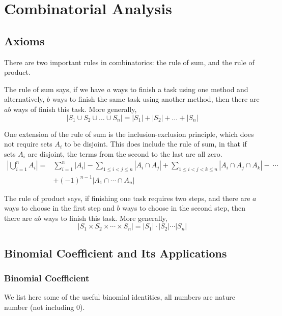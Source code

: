 \chapter{Combinatorial Analysis}
\section{Axioms} 
There are two important rules in combinatorics: the rule of sum, and the rule of product.

The rule of sum says, if we have $a$ ways to finish a task using one method and alternatively, $b$ ways to finish the same task using another method, then there are $ab$ ways of finish this task. More generally,
\begin{equation}
	|S_1 \cup S_2 \cup \ldots \cup S_n| = |S_1| + |S_2| + \ldots + |S_n|
\end{equation}

One extension of the rule of sum is the inclusion-exclusion principle, which does not require sets $A_i$ to be disjoint. This does include the rule of sum, in that if sets $A_i$ are disjoint, the terms from the second to the last are all zero.
\begin{equation}
\begin{split}
|\bigcup_{i=1}^n A_i| = & \sum_{i=1}^n|A_i| - \sum_{1 \le i < j \le n}|A_i\cap A_j| + \sum_{1 \le i < j < k \le n}|A_i\cap A_j\cap A_k|-\ \cdots\ \\
&  +  \left(-1\right)^{n-1} |A_1\cap\cdots\cap A_n|
\end{split}
\end{equation}

The rule of product says, if finishing one task requires two steps, and there are $a$ ways to choose in the first step and $b$ ways to choose in the second step, then there are $ab$ ways to finish this task. More generally,
\begin{equation}
|S_1 \times S_2 \times \cdots \times S_n| = |S_{1}| \cdot |S_{2}| \cdots |S_{n}|
\end{equation}

\section{Binomial Coefficient and Its Applications}
\subsection{Binomial Coefficient}
We list here some of the useful binomial identities, all numbers are nature number (not including 0).

